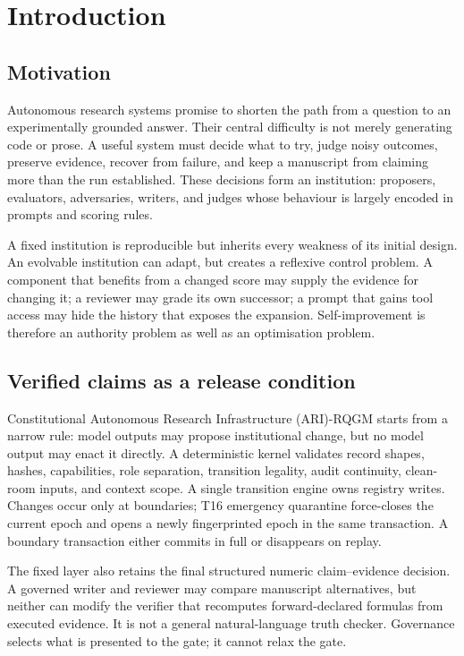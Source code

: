 \section{Introduction}\label{sec:intro}

\subsection{Motivation}\label{sec:intro:motivation}

Autonomous research systems promise to shorten the path from a question
to an experimentally grounded answer. Their central difficulty is not
merely generating code or prose. A useful system must decide what to try,
judge noisy outcomes, preserve evidence, recover from failure, and keep a
manuscript from claiming more than the run established. These decisions
form an institution: proposers, evaluators, adversaries, writers, and
judges whose behaviour is largely encoded in prompts and scoring rules.

A fixed institution is reproducible but inherits every weakness of its
initial design. An evolvable institution can adapt, but creates a reflexive
control problem. A component that benefits from a changed score may supply
the evidence for changing it; a reviewer may grade its own successor; a
prompt that gains tool access may hide the history that exposes the
expansion. Self-improvement is therefore an authority problem as well as
an optimisation problem.

\subsection{Verified claims as a release condition}\label{sec:intro:verified}

Constitutional Autonomous Research Infrastructure (ARI)-RQGM starts from a
narrow rule: model outputs may
propose institutional change, but no model output may enact it directly.
A deterministic kernel validates record shapes, hashes, capabilities,
role separation, transition legality, audit continuity, clean-room
inputs, and context scope. A single transition engine owns registry
writes. Changes occur only at boundaries; T16 emergency quarantine
force-closes the current epoch and opens a newly fingerprinted epoch in the
same transaction. A boundary transaction either commits in full or
disappears on replay.

The fixed layer also retains the final structured numeric
claim--evidence decision. A
governed writer and reviewer may compare manuscript alternatives, but
neither can modify the verifier that recomputes forward-declared formulas
from executed evidence. It is not a general natural-language truth
checker. Governance selects what is presented to the gate; it cannot
relax the gate.

